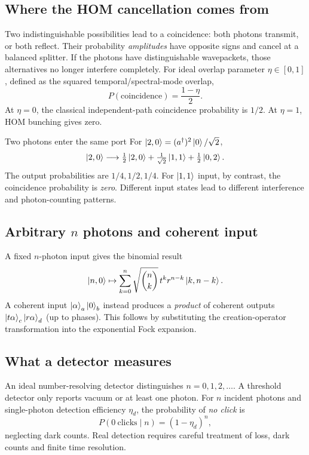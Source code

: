 \subsection{Where the HOM cancellation comes from}
Two indistinguishable possibilities lead to
a coincidence: both photons transmit, or
both reflect. Their probability \emph{amplitudes}
have opposite signs and cancel at a balanced splitter.
If the photons have distinguishable wavepackets,
those alternatives no longer interfere completely.
For ideal overlap parameter \(\eta\in[0,1]\),
defined as the squared temporal/spectral-mode overlap,
\[
P(\text{coincidence})=\frac{1-\eta}{2}.
\]
At \(\eta=0\), the classical independent-path
coincidence probability is \(1/2\). At \(\eta=1\),
HOM bunching gives zero.

\begin{worked}{Two photons enter the same port}
For \(\left\lvert 2,0\right\rangle=(a^\dagger)^2\left\lvert 0\right\rangle/\sqrt2\),
\[
\left\lvert 2,0\right\rangle\longrightarrow
\tfrac12\left\lvert 2,0\right\rangle+\tfrac1{\sqrt2}\left\lvert 1,1\right\rangle
+\tfrac12\left\lvert 0,2\right\rangle.
\]
The output probabilities are \(1/4,1/2,1/4\).
For \(\left\lvert 1,1\right\rangle\) input, by contrast, the
coincidence probability is \emph{zero}.
Different input states lead to different
interference and photon-counting patterns.
\end{worked}

\subsection{Arbitrary \(n\) photons and coherent input}
A fixed \(n\)-photon input gives the binomial result
\[
\left\lvert n,0\right\rangle\mapsto
\sum_{k=0}^n\sqrt{\binom nk}\,t^kr^{n-k}\left\lvert k,n-k\right\rangle.
\]
A coherent input \(\left\lvert \alpha\right\rangle_a\left\lvert 0\right\rangle_b\)
instead produces a \emph{product} of coherent
outputs \(\left\lvert t\alpha\right\rangle_c\left\lvert r\alpha\right\rangle_d\)
(up to phases). This follows by substituting
the creation-operator transformation into
the exponential Fock expansion.

\subsection{What a detector measures}
An ideal number-resolving detector distinguishes
\(n=0,1,2,\ldots\). A threshold detector
only reports vacuum or at least one photon.
For \(n\) incident photons and single-photon
detection efficiency \(\eta_d\), the probability
of \emph{no click} is
\[
P(0\ \text{clicks}\mid n)=(1-\eta_d)^n,
\]
neglecting dark counts. Real detection
requires careful treatment of loss, dark counts
and finite time resolution.

